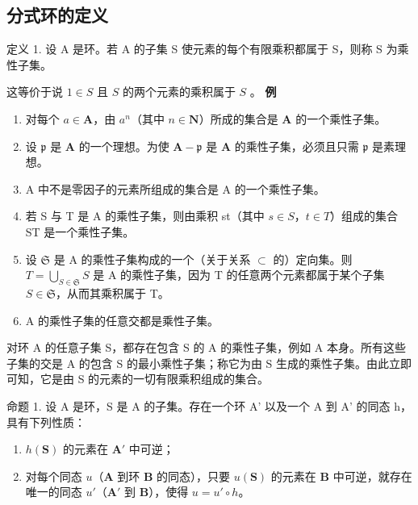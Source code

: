 \subsection{分式环的定义}

定义 1. 设 A 是环。若 A 的子集 S 使元素的每个有限乘积都属于 S，则称 S 为乘性子集。

这等价于说 \(1 \in S\) 且 \(S\) 的两个元素的乘积属于 \(S\) 。
\relax{}
\textbf{例}\par

\begin{enumerate}
\def\labelenumi{(\arabic{enumi})}
\item
  对每个 \(a \in \mathbf{A}\)，由 \(a^n\)（其中 \(n \in \mathbf{N}\)）所成的集合是 \(\mathbf{A}\) 的一个乘性子集。
\item
  设 \(\mathfrak{p}\) 是 \(\mathbf{A}\) 的一个理想。为使 \(\mathbf{A} - \mathfrak{p}\) 是 \(\mathbf{A}\) 的乘性子集，必须且只需 \(\mathfrak{p}\) 是素理想。
\item
  A 中不是零因子的元素所组成的集合是 A 的一个乘性子集。
\item
  若 S 与 T 是 A 的乘性子集，则由乘积 st（其中 \(s \in S\)，\(t \in T\)）组成的集合 ST 是一个乘性子集。
\item
  设 \(\mathfrak{S}\) 是 A 的乘性子集构成的一个（关于关系 \(\subset\) 的）定向集。则 \(T = \bigcup_{S \in \mathfrak{S}} S\) 是 A 的乘性子集，因为 T 的任意两个元素都属于某个子集 \(S \in \mathfrak{S}\)，从而其乘积属于 T。
\item
  A 的乘性子集的任意交都是乘性子集。
\end{enumerate}

对环 A 的任意子集 S，都存在包含 S 的 A 的乘性子集，例如 A 本身。所有这些子集的交是 A 的包含 S 的最小乘性子集；称它为由 S 生成的乘性子集。由此立即可知，它是由 S 的元素的一切有限乘积组成的集合。

命题 1. 设 A 是环，S 是 A 的子集。存在一个环 A' 以及一个 A 到 A' 的同态 h，具有下列性质：

\begin{enumerate}
\def\labelenumi{(\arabic{enumi})}
\item
  \(h(\mathbf{S})\) 的元素在 \(\mathbf{A}'\) 中可逆；
\item
  对每个同态 \(u\)（\(\mathbf{A}\) 到环 \(\mathbf{B}\) 的同态），只要 \(u(\mathbf{S})\) 的元素在 \(\mathbf{B}\) 中可逆，就存在唯一的同态 \(u'\)（\(\mathbf{A}'\) 到 \(\mathbf{B}\)），使得 \(u = u' \circ h\)。
\end{enumerate}


